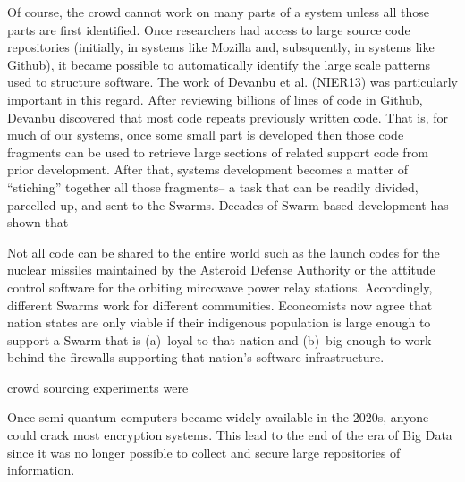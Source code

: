 \documentclass[journal]{IEEEtran}
\begin{document}
Of course, the crowd cannot work on many parts of a system unless all those
parts are first identified. Once researchers had access to large source code repositories (initially, in systems like Mozilla and, subsquently, in systems
like Github), it became possible to  automatically identify the large scale patterns used to structure software. The work of Devanbu et al. (NIER13) was particularly important in this regard.  After reviewing billions of lines of code in Github, Devanbu discovered that most code repeats previously written code. That is, for much of our systems, once some small part is developed then those code fragments can be used to retrieve large sections of related support code from prior development. After that, systems development becomes a matter of ``stiching'' together all those fragments-- a task that can be readily divided, parcelled up, and sent to the Swarms.  Decades of Swarm-based development
has shown that 

Not all code can be shared to the entire world such as  the launch codes for the
  nuclear missiles maintained by the Asteroid Defense Authority or the 
  attitude control software for the orbiting mircowave power relay stations. 
  Accordingly, different Swarms work for different communities. Econcomists
  now agree that nation states are only viable if their indigenous population
  is large enough to support a Swarm that is (a)~loyal to that nation and (b)~big enough to work behind the firewalls supporting that nation's  software infrastructure.
  
  



crowd sourcing experiments were 


Once     
semi-quantum computers became widely available in the 2020s, anyone could
crack most encryption systems.   This lead to the end of the era of Big
Data since it was no longer possible to collect and secure large repositories
of information.
\end{document}
